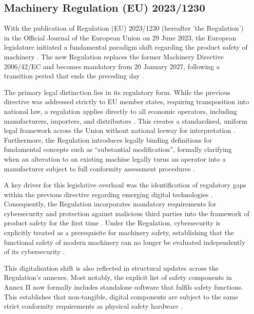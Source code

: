 \subsection{Machinery Regulation (EU) 2023/1230}
\label{subsec:eu_machinery_regulation}

With the publication of Regulation (EU) 2023/1230 (hereafter 'the Regulation') in the Official Journal of the European Union on 29 June 2023, the European legislature initiated a fundamental paradigm shift regarding the product safety of machinery \cite[p. 32]{https://doi.org/10.1002/citp.202501012}. The new Regulation replaces the former Machinery Directive 2006/42/EC and becomes mandatory from 20 January 2027, following a transition period that ends the preceding day \cite[p. 38]{EU2023_1230}.

The primary legal distinction lies in its regulatory form. While the previous directive was addressed strictly to EU member states, requiring transposition into national law, a regulation applies directly to all economic operators, including manufacturers, importers, and distributors \cite[p. 32]{https://doi.org/10.1002/citp.202501012} \cite[p. 15]{EU2023_1230}. This creates a standardised, uniform legal framework across the Union without national leeway for interpretation \cite[p. 38]{EU2023_1230}. Furthermore, the
Regulation introduces legally binding definitions for fundamental concepts such as ``substantial modification'', formally clarifying when an alteration to an existing machine legally turns an operator into a manufacturer subject to full conformity assessment procedures \cite[p. 25]{EU2023_1230}.

A key driver for this legislative overhaul was the identification of regulatory gaps within the previous directive regarding emerging digital technologies \cite[p. 2]{EU2023_1230}. Consequently, the
Regulation incorporates mandatory requirements for cybersecurity and protection against malicious third parties into the framework of product safety for the first time \cite[p. 33]{https://doi.org/10.1002/citp.202501012}. Under the Regulation, cybersecurity is explicitly treated as a prerequisite for machinery safety, establishing that the functional safety of modern machinery can no longer be evaluated independently of its cybersecurity \cite{carl2026_maschinenverordnung}.

This digitalisation shift is also reflected in structural updates across the Regulation's annexes. Most notably, the explicit list of safety components in Annex II now formally includes standalone software that fulfils safety functions. This establishes that non-tangible, digital components are subject to the same strict conformity requirements as physical safety hardware \cite[pp. 42]{EU2023_1230}. 

